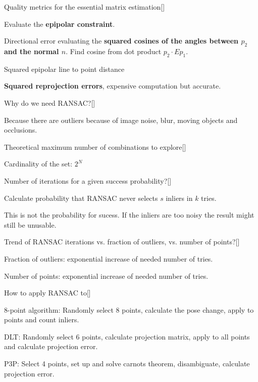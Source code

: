 \documentclass[10pt,a4paper]{scrartcl}
\begin{document}
\begin{multicols*}{2}
\begin{QandA}
{Quality metrics for the essential matrix estimation}[\Application]
\item Evaluate the \textbf{epipolar constraint}.
\item Directional error evaluating the \textbf{squared cosines of the angles between $p_2$ and the normal $n$}. Find cosine from dot product $p_2\cdot Ep_1$.
\item Squared epipolar line to point distance
\item \textbf{Squared reprojection errors}, expensive computation but accurate.
\end{QandA}

\begin{QandA}
{Why do we need RANSAC?}[\Application]
\item Because there are outliers because of image noise, blur, moving objects and occlusions.
\end{QandA}

\begin{QandA}{Theoretical maximum number of combinations to explore}[\Application]
\item Cardinality of the set: $2^N$
\end{QandA}

\begin{QandA}
{Number of iterations for a given success probability?}[\Derivation]
\item {}
\item Calculate probability that RANSAC never selects $s$ inliers in $k$ tries.
\item This is not the probability for sucess. If the inliers are too noisy the result might still be unusable.
\end{QandA}

\begin{QandA}
{Trend of RANSAC iterations vs. fraction of outliers, vs. number of points?}[\Application]
\item Fraction of outliers: exponential increase of needed number of tries.
\item Number of points: exponential increase of needed number of tries.
\end{QandA}

\begin{QandA}
{How to apply RANSAC to}[\Comparison]
\item 8-point algorithm: Randomly select 8 points, calculate the pose change, apply to points and count inliers.
\item DLT: Randomly select 6 points, calculate projection matrix, apply to all points and calculate projection error.
\item P3P: Select 4 points, set up and solve carnots theorem, disambiguate, calculate projection error. 
\end{QandA}


\end{multicols*}
\end{document}
